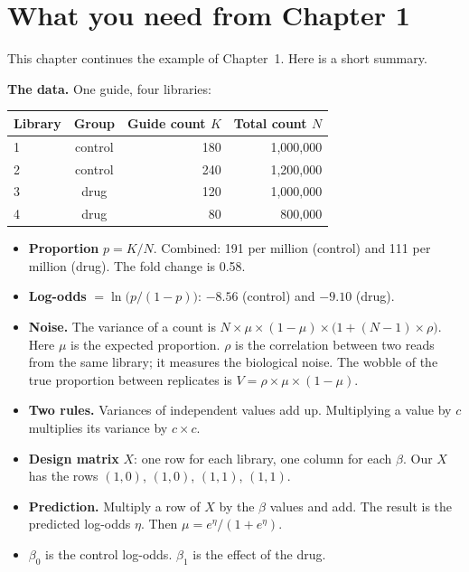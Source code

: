 \ifstandalone
\section{What you need from Chapter 1}

This chapter continues the example of Chapter~1. Here is a short summary.

\textbf{The data.} One guide, four libraries:

\begin{center}
\begin{tabular}{lcrr}
\toprule
Library & Group & Guide count $K$ & Total count $N$\\
\midrule
1 & control & 180 & 1{,}000{,}000\\
2 & control & 240 & 1{,}200{,}000\\
3 & drug    & 120 & 1{,}000{,}000\\
4 & drug    &  80 &   800{,}000\\
\bottomrule
\end{tabular}
\end{center}

\begin{itemize}
\item \textbf{Proportion} $p = K/N$. Combined: 191 per million (control) and
  111 per million (drug). The fold change is 0.58.
\item \textbf{Log-odds} $= \ln\bigl(p/(1-p)\bigr)$: $-8.56$ (control) and
  $-9.10$ (drug).
\item \textbf{Noise.} The variance of a count is
  $N \times \mu \times (1-\mu) \times \bigl(1 + (N-1) \times \rho\bigr)$.
  Here $\mu$ is the expected proportion. $\rho$ is the correlation between
  two reads from the same library; it measures the biological noise. The
  wobble of the true proportion between replicates is
  $V = \rho \times \mu \times (1-\mu)$.
\item \textbf{Two rules.} Variances of independent values add up. Multiplying
  a value by $c$ multiplies its variance by $c \times c$.
\item \textbf{Design matrix} $X$: one row for each library, one column for
  each $\beta$. Our $X$ has the rows $(1,0)$, $(1,0)$, $(1,1)$, $(1,1)$.
\item \textbf{Prediction.} Multiply a row of $X$ by the $\beta$ values and add.
  The result is the predicted log-odds $\eta$. Then
  $\mu = e^{\eta}/(1+e^{\eta})$.
\item $\beta_0$ is the control log-odds. $\beta_1$ is the effect of the drug.
\end{itemize}
\fi

